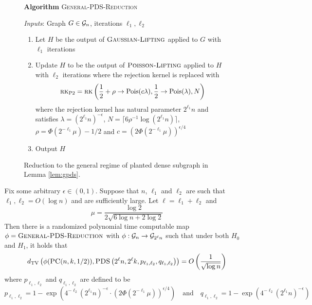 \begin{figure}[t!]
\begin{algbox}
\textbf{Algorithm} \textsc{General-PDS-Reduction}

\vspace{2mm}

\textit{Inputs}: Graph $G \in \mathcal{G}_n$, iterations $\ell_1, \ell_2$
\begin{enumerate}
\item Let $H$ be the output of $\textsc{Gaussian-Lifting}$ applied to $G$ with $\ell_1$ iterations
\item Update $H$ to be the output of $\textsc{Poisson-Lifting}$ applied to $H$ with $\ell_2$ iterations where the rejection kernel is replaced with
$$\textsc{rk}_{\text{P2}} = \textsc{rk}\left(\frac{1}{2} + \rho \to \text{Pois}(c\lambda), \frac{1}{2} \to \text{Pois}(\lambda), N \right)$$
where the rejection kernel has natural parameter $2^{\ell_1} n$ and satisfies $\lambda = (2^{\ell_1} n)^{-\epsilon}$, $N = \lceil 6 \rho^{-1} \log (2^{\ell_1}n) \rceil$, $\rho = \Phi(2^{-\ell_1} \mu) - 1/2$ and $c = \left( 2\Phi\left(2^{-\ell_1} \mu \right)\right)^{\epsilon/4}$
\item Output $H$
\end{enumerate}
\vspace{1mm}
\end{algbox}
\caption{Reduction to the general regime of planted dense subgraph in Lemma \ref{lem:gpds}.}
\label{fig:bc}
\end{figure}

\begin{lemma} \label{lem:gpds}
Fix some arbitrary $\epsilon \in (0, 1)$. Suppose that $n$, $\ell_1$ and $\ell_2$ are such that $\ell_1, \ell_2 = O(\log n)$ and are sufficiently large. Let $\ell = \ell_1 + \ell_2$ and
$$\mu = \frac{\log 2}{2 \sqrt{6 \log n + 2\log 2}}$$
Then there is a randomized polynomial time computable map $\phi = \textsc{General-PDS-Reduction}$ with $\phi : \mathcal{G}_n \to \mathcal{G}_{2^\ell n}$ such that under both $H_0$ and $H_1$, it holds that
$$d_{\text{TV}}\left( \phi(\textsc{PC}(n, k, 1/2)), \textsc{PDS}\left(2^\ell n, 2^\ell k, p_{\ell_1, \ell_2}, q_{\ell_1, \ell_2} \right) \right) = O\left( \frac{1}{\sqrt{\log n}} \right)$$
where $p_{\ell_1, \ell_2}$ and $q_{\ell_1, \ell_2}$ are defined to be
$$p_{\ell_1, \ell_2} = 1 - \exp\left( 4^{-\ell_2} \left(2^{\ell_1}n\right)^{-\epsilon} \cdot \left( 2 \Phi\left(2^{-\ell_1} \mu \right) \right)^{\epsilon/4} \right) \quad \text{and} \quad q_{\ell_1, \ell_2} = 1 - \exp\left( 4^{-\ell_2} \left(2^{\ell_1} n\right)^{-\epsilon} \right)$$
\end{lemma}

